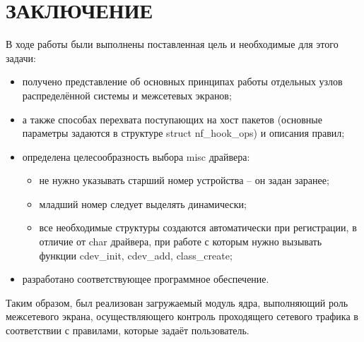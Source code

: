 \section*{ЗАКЛЮЧЕНИЕ}

В ходе работы были выполнены поставленная цель и необходимые для этого задачи:
\begin{itemize}
	\item получено представление об основных принципах работы отдельных узлов распределённой системы и межсетевых экранов;

	\item а также способах перехвата поступающих на хост пакетов (основные параметры задаются в структуре struct nf\_hook\_ops) и описания правил;
	
	\item определена целесообразность выбора misc драйвера:
	\begin{itemize}
		\item не нужно указывать старший номер устройства -- он задан заранее;
		
		\item младший номер следует выделять динамически;
		
		\item все необходимые структуры создаются автоматически при регистрации, в отличие от char драйвера, при работе с которым нужно вызывать функции cdev\_init, cdev\_add, class\_create;
	\end{itemize}
	
	\item разработано соответствующее программное обеспечение.\newline
\end{itemize}

Таким образом, был реализован загружаемый модуль ядра, выполняющий роль межсетевого экрана, осуществляющего контроль проходящего сетевого трафика в соответствии с правилами, которые задаёт пользователь. 

\pagebreak